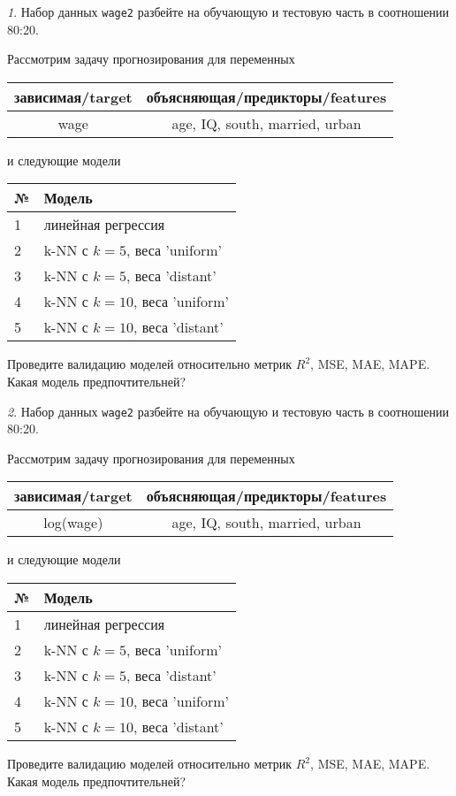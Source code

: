 \documentclass[12pt]{article}
\theoremstyle{remark}
\newtheorem{exercise}{}[section]
\begin{document}
\begin{exercise}
Набор данных \texttt{wage2} разбейте на обучающую и тестовую часть
в соотношении 80:20.

Рассмотрим задачу прогнозирования для переменных
\begin{center}
	\begin{tabular}{|c|c|}\hline
		зависимая/target & объясняющая/предикторы/features \\ \hline
		wage & age, IQ, south, married, urban \\ \hline
	\end{tabular}
\end{center}
и следующие модели
\begin{center}
	\begin{tabular}{|l|l|}\hline
		№ & Модель \\ \hline
		1 & линейная регрессия\\
		2 & k-NN с \(k=5\), веса 'uniform' \\
		3 & k-NN с \(k=5\), веса 'distant' \\
		4 & k-NN с \(k=10\), веса 'uniform' \\
		5 & k-NN с \(k=10\), веса 'distant' \\ \hline
	\end{tabular}
\end{center}
Проведите валидацию моделей относительно метрик \(R^2\), MSE, MAE,
MAPE. Какая модель предпочтительней?
\end{exercise}

\begin{exercise}
Набор данных \texttt{wage2} разбейте на обучающую и тестовую часть
в соотношении 80:20.

Рассмотрим задачу прогнозирования для переменных
\begin{center}
	\begin{tabular}{|c|c|}\hline
		зависимая/target & объясняющая/предикторы/features \\ \hline
		log(wage) & age, IQ, south, married, urban \\ \hline
	\end{tabular}
\end{center}
и следующие модели
\begin{center}
	\begin{tabular}{|l|l|}\hline
		№ & Модель \\ \hline
		1 & линейная регрессия\\
		2 & k-NN с \(k=5\), веса 'uniform' \\
		3 & k-NN с \(k=5\), веса 'distant' \\
		4 & k-NN с \(k=10\), веса 'uniform' \\
		5 & k-NN с \(k=10\), веса 'distant' \\ \hline
	\end{tabular}
\end{center}
Проведите валидацию моделей относительно метрик \(R^2\), MSE, MAE,
MAPE. Какая модель предпочтительней?
\end{exercise}
\end{document}
